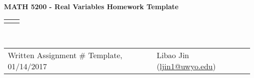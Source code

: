 \documentclass[11pt]{article}
\renewcommand{\title}[1]{\textbf{#1}\\}
\renewcommand{\line}{\begin{tabularx}{\textwidth}{X>{\raggedleft}X}\hline\\\end{tabularx}\\[-0.5cm]}
\newcommand{\leftright}[2]{\begin{tabularx}{\textwidth}{X>{\raggedleft}X}#1%
& #2\\\end{tabularx}\\[-0.5cm]}
\renewcommand{\theequation}{\thesection.\arabic{equation}}
\numberwithin{equation}{section}
\begin{document}
\title{MATH 5200 - Real Variables Homework Template}
\line
\leftright{Written Assignment \# Template, 01/14/2017}{Libao Jin (\url{ljin1@uwyo.edu})}

\vspace*{-2cm}
\renewcommand{\theequation}{1.\arabic{equation}}
\setcounter{equation}{0}

\end{document}
